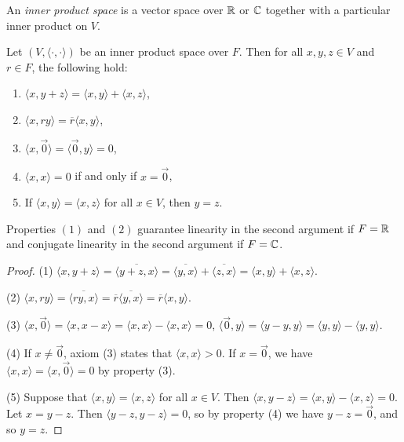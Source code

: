 \begin{defn}
    An \emph{inner product space} is a vector space over $\mathbb{R}$ or $\mathbb{C}$ together with a particular inner product on $V$.
\end{defn}

\begin{thm}\label{inner-product-properties}
    Let $(V, \langle\cdot,\cdot\rangle)$ be an inner product space over $F$. Then for all $x, y, z \in V$ and $r \in F$, the following hold:
    \begin{enumerate}[label=(\arabic*)]
        \item $\langle x, y+z \rangle = \langle x, y \rangle + \langle x, z \rangle$,
        \item $\langle x, ry \rangle = \overline{r}\langle x, y \rangle$,
        \item $\langle x, \vec{0} \rangle = \langle \vec{0}, y \rangle = 0$,
        \item $\langle x, x \rangle = 0$ if and only if $x = \vec{0}$,
        \item If $\langle x, y \rangle = \langle x, z \rangle$ for all $x \in V$, then $y = z$.
    \end{enumerate}
\end{thm}

\begin{rmk}
    Properties $(1)$ and $(2)$ guarantee linearity in the second argument if $F = \mathbb{R}$ and conjugate linearity in the second argument if $F = \mathbb{C}$.
\end{rmk}

\begin{proof}\proofbreak
    (1) $\langle x, y+z \rangle = \overline{\langle y+z, x \rangle} = \overline{\langle y, x \rangle} + \overline{\langle z, x \rangle} = \langle x, y \rangle + \langle x, z \rangle$.

    (2) $\langle x, ry \rangle = \overline{\langle ry, x \rangle} = \overline{r}\overline{\langle y, x \rangle} = \overline{r}\langle x, y \rangle$.

    (3) $\langle x, \vec{0} \rangle = \langle x, x - x \rangle = \langle x, x \rangle - \langle x, x \rangle = 0$, $\langle \vec{0}, y \rangle = \langle y - y, y \rangle = \langle y, y \rangle - \langle y, y \rangle$.

    (4) If $x \neq \vec{0}$, axiom (3) states that $\langle x, x \rangle > 0$. If $x = \vec{0}$, we have $\langle x, x \rangle = \langle x, \vec{0} \rangle = 0$ by property (3).

    (5) Suppose that $\langle x, y \rangle = \langle x, z \rangle$ for all $x \in V$. Then $\langle x, y-z \rangle = \langle x, y \rangle - \langle x, z \rangle = 0$. Let $x = y-z$. Then $\langle y-z, y-z \rangle = 0$, so by property (4) we have $y - z = \vec{0}$, and so $y = z$.
\end{proof}

